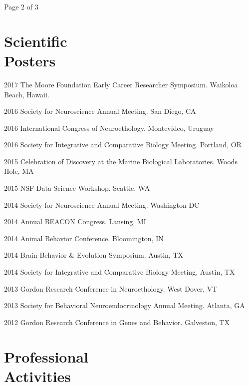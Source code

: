 \documentclass[margin,line]{resume}
\begin{document}
\begin{resume}
\begin{list1}
\end{list1}


\vspace{1.5 cm}
{\centerline {Page 2 of 3}}
\newpage



\section{\mysidestyle Scientific\\Posters}

\begin{list1}

\item[]2017	The Moore Foundation Early Career Researcher Symposium. Waikoloa Beach, Hawaii.
\item[]2016	Society for Neuroscience Annual Meeting. San Diego, CA
\item[]2016	International Congress of Neuroethology. Montevideo, Uruguay
\item[]2016 	Society for Integrative and Comparative Biology Meeting. Portland, OR
\item[]2015	Celebration of Discovery at the Marine Biological Laboratories. Woods Hole, MA
\item[]2015	NSF Data Science Workshop. Seattle, WA
\item[]2014	Society for Neuroscience Annual Meeting. Washington DC
\item[]2014	Annual BEACON Congress. Lansing, MI
\item[]2014	Animal Behavior Conference. Bloomington, IN
\item[]2014	Brain Behavior \& Evolution Symposium. Austin, TX
\item[]2014	Society for Integrative and Comparative Biology Meeting. Austin, TX
\item[]2013	Gordon Research Conference in Neuroethology. West Dover, VT
\item[]2013	Society for Behavioral Neuroendocrinology Annual Meeting. Atlanta, GA
\item[]2012	Gordon Research Conference in Genes and Behavior. Galveston, TX

\end{list1}
    
    
    \section{\mysidestyle Professional\\Activities}


\end{resume}
\end{document}
